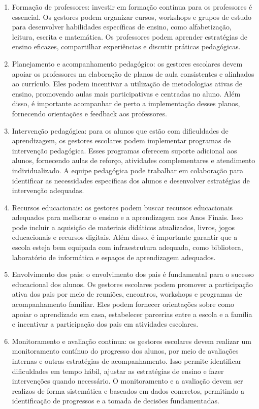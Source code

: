 \begin{enumerate}
\def\labelenumi{\arabic{enumi}.}
\setcounter{enumi}{1}
\item
  Formação de professores: investir em formação contínua para os
  professores é essencial. Os gestores podem organizar cursos, workshops
  e grupos de estudo para desenvolver habilidades específicas de ensino,
  como alfabetização, leitura, escrita e matemática. Os professores
  podem aprender estratégias de ensino eficazes, compartilhar
  experiências e discutir práticas pedagógicas.
\item
  Planejamento e acompanhamento pedagógico: os gestores escolares devem
  apoiar os professores na elaboração de planos de aula consistentes e
  alinhados ao currículo. Eles podem incentivar a utilização de
  metodologias ativas de ensino, promovendo aulas mais participativas e
  centradas no aluno. Além disso, é importante acompanhar de perto a
  implementação desses planos, fornecendo orientações e feedback aos
  professores.
\item
  Intervenção pedagógica: para os alunos que estão com dificuldades de
  aprendizagem, os gestores escolares podem implementar programas de
  intervenção pedagógica. Esses programas oferecem suporte adicional aos
  alunos, fornecendo aulas de reforço, atividades complementares e
  atendimento individualizado. A equipe pedagógica pode trabalhar em
  colaboração para identificar as necessidades específicas dos alunos e
  desenvolver estratégias de intervenção adequadas.
\item
  Recursos educacionais: os gestores podem buscar recursos educacionais
  adequados para melhorar o ensino e a aprendizagem nos Anos Finais.
  Isso pode incluir a aquisição de materiais didáticos atualizados,
  livros, jogos educacionais e recursos digitais. Além disso, é
  importante garantir que a escola esteja bem equipada com
  infraestrutura adequada, como biblioteca, laboratório de informática e
  espaços de aprendizagem adequados.
\item
  Envolvimento dos pais: o envolvimento dos pais é fundamental para o
  sucesso educacional dos alunos. Os gestores escolares podem promover a
  participação ativa dos pais por meio de reuniões, encontros, workshops
  e programas de acompanhamento familiar. Eles podem fornecer
  orientações sobre como apoiar o aprendizado em casa, estabelecer
  parcerias entre a escola e a família e incentivar a participação dos
  pais em atividades escolares.
\item
  Monitoramento e avaliação contínua: os gestores escolares devem
  realizar um monitoramento contínuo do progresso dos alunos, por meio
  de avaliações internas e outras estratégias de acompanhamento. Isso
  permite identificar dificuldades em tempo hábil, ajustar as
  estratégias de ensino e fazer intervenções quando necessário. O
  monitoramento e a avaliação devem ser realizos de forma sistemática e
  baseados em dados concretos, permitindo a identificação de progressos
  e a tomada de decisões fundamentadas.
\end{enumerate}

